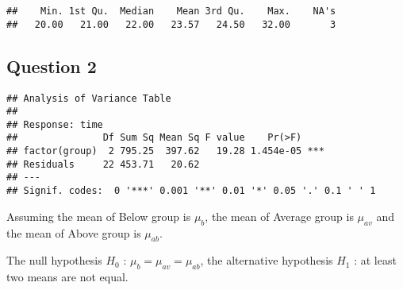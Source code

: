 \documentclass[]{article}
\newenvironment{Shaded}{\begin{snugshade}}{\end{snugshade}}
\newcommand{\KeywordTok}[1]{\textcolor[rgb]{0.13,0.29,0.53}{\textbf{#1}}}
\newcommand{\DataTypeTok}[1]{\textcolor[rgb]{0.13,0.29,0.53}{#1}}
\newcommand{\StringTok}[1]{\textcolor[rgb]{0.31,0.60,0.02}{#1}}
\newcommand{\CommentTok}[1]{\textcolor[rgb]{0.56,0.35,0.01}{\textit{#1}}}
\newcommand{\OperatorTok}[1]{\textcolor[rgb]{0.81,0.36,0.00}{\textbf{#1}}}
\newcommand{\NormalTok}[1]{#1}
\begin{document}
\begin{Shaded}
\end{Shaded}

\begin{verbatim}
##    Min. 1st Qu.  Median    Mean 3rd Qu.    Max.    NA's 
##   20.00   21.00   22.00   23.57   24.50   32.00       3
\end{verbatim}

\subsection{Question 2}\label{question-2-2}

\begin{Shaded}
\end{Shaded}

\begin{verbatim}
## Analysis of Variance Table
## 
## Response: time
##               Df Sum Sq Mean Sq F value    Pr(>F)    
## factor(group)  2 795.25  397.62   19.28 1.454e-05 ***
## Residuals     22 453.71   20.62                      
## ---
## Signif. codes:  0 '***' 0.001 '**' 0.01 '*' 0.05 '.' 0.1 ' ' 1
\end{verbatim}

Assuming the mean of Below group is \(\mu_b\), the mean of Average group
is \(\mu_{av}\) and the mean of Above group is \(\mu_{ab}\).

The null hypothesis \(H_0\) : \(\mu_b = \mu_{av} = \mu_{ab}\), the
alternative hypothesis \(H_1\) : at least two means are not equal.
\end{document}
